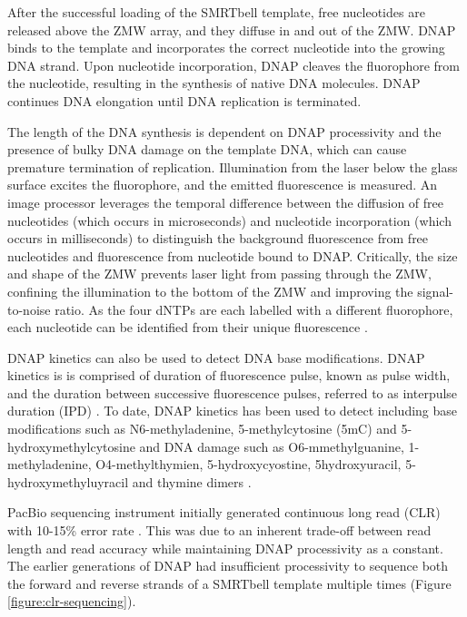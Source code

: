 After the successful loading of the SMRTbell template, free nucleotides are released above the ZMW array, and they diffuse in and out of the ZMW. DNAP binds to the template and incorporates the correct nucleotide into the growing DNA strand. Upon nucleotide incorporation, DNAP cleaves the fluorophore from the nucleotide, resulting in the synthesis of native DNA molecules. DNAP continues DNA elongation until DNA replication is terminated.

The length of the DNA synthesis is dependent on DNAP processivity and the presence of bulky DNA damage on the template DNA, which can cause premature termination of replication. Illumination from the laser below the glass surface excites the fluorophore, and the emitted fluorescence is measured. An image processor leverages the temporal difference between the diffusion of free nucleotides (which occurs in microseconds) and nucleotide incorporation (which occurs in milliseconds) to distinguish the background fluorescence from free nucleotides and fluorescence from nucleotide bound to DNAP. Critically, the size and shape of the ZMW prevents laser light from passing through the ZMW, confining the illumination to the bottom of the ZMW and improving the signal-to-noise ratio. As the four dNTPs are each labelled with a different fluorophore, each nucleotide can be identified from their unique fluorescence \cite{Eid2009-ol}. 

DNAP kinetics can also be used to detect DNA base modifications. DNAP kinetics is is comprised of duration of fluorescence pulse, known as pulse width, and the duration between successive fluorescence pulses, referred to as interpulse duration (IPD) \cite{Flusberg2010-ub}. To date, DNAP kinetics has been used to detect including base modifications such as N6-methyladenine, 5-methylcytosine (5mC) and 5-hydroxymethylcytosine \cite{Flusberg2010-ub} and DNA damage such as O6-mmethylguanine, 1-methyladenine, O4-methylthymien, 5-hydroxycyostine, 5hydroxyuracil, 5-hydroxymethyluyracil and thymine dimers \cite{Clark2011-jz}. 

PacBio sequencing instrument initially generated continuous long read (CLR) with 10-15\% error rate \cite{Eid2009-ol}. This was due to an inherent trade-off between read length and read accuracy while maintaining DNAP processivity as a constant. The earlier generations of DNAP had insufficient processivity to sequence both the forward and reverse strands of a SMRTbell template multiple times (Figure \ref{figure:clr-sequencing}).

